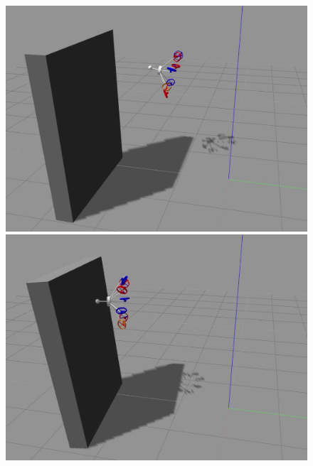 \begin{figure}[!ht]
\begin{center}
\begin{minipage}[t]{0.495\textwidth}
      \includegraphics[width=\linewidth]{images/Selection_017.png}
    \end{minipage}
    \hfill
    \begin{minipage}[t]{0.495\textwidth}
      \includegraphics[width=\linewidth]{images/Selection_019.png}
    \end{minipage}
    \hfill
    \begin{minipage}[t]{0.495\textwidth}

\end{minipage}
\end{center}
\end{figure}
